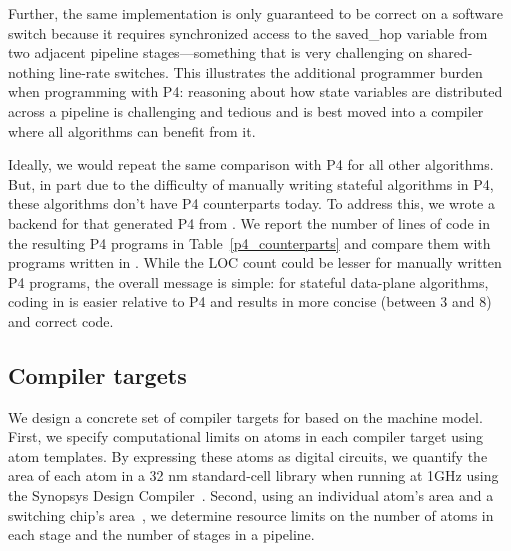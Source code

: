 Further, the same implementation is only guaranteed to be correct on a software
switch because it requires synchronized access to the saved\_hop variable from
two adjacent pipeline stages---something that is very challenging on
shared-nothing line-rate switches. This illustrates the additional programmer
burden when programming with P4: reasoning about how state variables are
distributed across a pipeline is challenging and tedious and is best moved into
a compiler where all algorithms can benefit from it.

Ideally, we would repeat the same comparison with P4 for all other algorithms.
But, in part due to the difficulty of manually writing stateful algorithms in
P4, these algorithms don't have P4 counterparts today. To address this, we
wrote a backend for \pktlanguage that generated P4 from \pktlanguage.  We
report the number of lines of code in the resulting P4 programs in
Table~\ref{p4_counterparts} and compare them with programs written in
\pktlanguage. While the LOC count could be lesser for manually written P4
programs, the overall message is simple: for stateful data-plane algorithms,
coding in \pktlanguage is easier relative to P4 and results in more concise
(between 3 and 8\times) and correct code.


\subsection{Compiler targets}

We design a concrete set of compiler targets for \pktlanguage based on the
\absmachine machine model. First, we specify computational limits on atoms in
each compiler target using atom templates. By expressing these atoms as digital
circuits, we quantify the area of each atom in a 32 nm standard-cell library
when running at 1GHz using the Synopsys Design Compiler~\cite{synopsys_dc}.
Second, using an individual atom's area and a switching chip's
area~\cite{gibb_parsing}, we determine resource limits on the number of atoms
in each stage and the number of stages in a pipeline.


